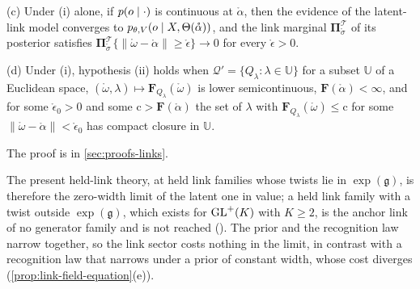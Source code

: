 (c) Under (i) alone, if $p(o\mid\cdot)$ is continuous at $\mathring\alpha$, then the evidence of the
latent-link model converges to $p_{\theta,V}(o\mid X,\Theta(\mathring\alpha))$, and the link marginal
$\boldsymbol\Pi^{\mathscr T}_{\mathring\sigma}$ of its posterior satisfies
$\boldsymbol\Pi^{\mathscr T}_{\mathring\sigma}\{\lVert\mathring\omega-\mathring\alpha\rVert\geq\mathring\epsilon\}\to0$ for every
$\mathring\epsilon>0$.

(d) Under (i), hypothesis (ii) holds when $\mathcal Q'=\{Q_\lambda:\lambda\in\mathbb U\}$ for a subset $\mathbb U$ of a
Euclidean space, $(\mathring\omega,\lambda)\mapsto\mathbf F_{Q_\lambda}(\mathring\omega)$ is lower semicontinuous,
$\mathbf F(\mathring\alpha)<\infty$, and for some $\mathring\epsilon_0>0$ and some $\mathrm c>\mathbf F(\mathring\alpha)$ the set
of $\lambda$ with $\mathbf F_{Q_\lambda}(\mathring\omega)\leq\mathrm c$ for some
$\lVert\mathring\omega-\mathring\alpha\rVert<\mathring\epsilon_0$ has compact closure in $\mathbb U$. 

The proof is in \cref{sec:proofs-links}.

The present held-link theory, at held link families whose twists lie in $\exp(\mathfrak g)$, is
therefore the zero-width limit of the latent one in value; a held link family with a twist outside
$\exp(\mathfrak g)$, which exists for $\mathrm{GL}^+(K)$ with $K\geq2$, is the anchor link of no generator
family and is not reached (). The prior and
the recognition law narrow together, so the link sector costs nothing in the limit, in contrast with a
recognition law that narrows under a prior of constant width, whose cost diverges
(\cref{prop:link-field-equation}(e)).

